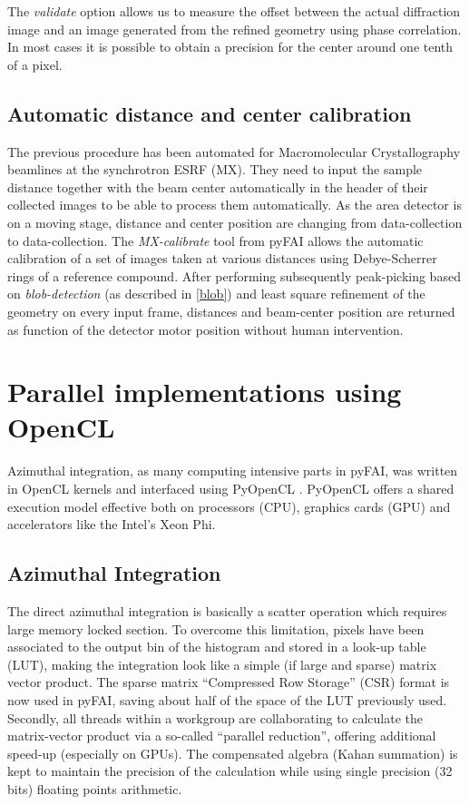 \documentclass[preprint]{iucr}
\begin{document}
The \textit{validate} option allows us to measure the offset between the actual
diffraction image and an image generated from the refined geometry using phase
correlation. In most cases it is possible to obtain a precision for the
center around one tenth of a pixel.

\subsection{Automatic distance and center calibration}
The previous procedure has been automated for Macromolecular Crystallography
beamlines at the synchrotron ESRF (MX). They need to input the sample
distance together  with the beam center automatically in the header of their
collected images to be able to process them automatically.
As the area detector is on a moving stage, distance and center position are
changing from data-collection to data-collection.
The \textit{MX-calibrate} tool from pyFAI allows the automatic calibration of
a set of images taken at various distances using Debye-Scherrer rings of a
reference compound.
After performing subsequently peak-picking based on \textit{blob-detection}
(as described in \ref{blob}) and least square refinement of the geometry on
every input frame, distances and beam-center position are returned as function
of the detector motor position without human intervention.

\section{Parallel implementations using OpenCL}

Azimuthal integration, as  many computing intensive parts in pyFAI, was
written in OpenCL kernels and interfaced using PyOpenCL \cite{pyopencl}.
PyOpenCL offers a
shared execution model effective both on processors (CPU), graphics cards (GPU)
and accelerators like the Intel's Xeon Phi.

\subsection{Azimuthal Integration}
The direct azimuthal integration is basically a scatter operation which
requires large memory locked section.
To overcome this limitation, pixels have been
associated to the output bin of the histogram and stored in a look-up
table (LUT), making the integration look like a simple (if large and sparse)
matrix vector product.
The sparse matrix ``Compressed Row Storage'' (CSR) format is now used in pyFAI,
saving about half of the space of the LUT previously used.
Secondly, all threads within a workgroup are collaborating to calculate the
matrix-vector product via a so-called ``parallel reduction'', offering
additional speed-up (especially on GPUs).
The compensated algebra (Kahan summation) is kept to maintain the precision
of the calculation while using single precision (32 bits) floating points
arithmetic.
\end{document}
